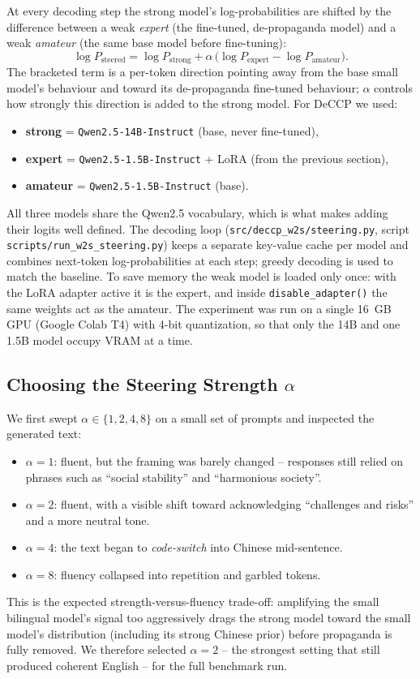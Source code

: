 \documentclass[11pt,a4paper]{article}
\begin{document}
At every decoding step the strong model's log-probabilities are shifted by the difference between a weak \emph{expert} (the fine-tuned, de-propaganda model) and a weak \emph{amateur} (the same base model before fine-tuning):
\[
\log P_{\text{steered}} = \log P_{\text{strong}} + \alpha \,\bigl(\log P_{\text{expert}} - \log P_{\text{amateur}}\bigr).
\]
The bracketed term is a per-token direction pointing away from the base small model's behaviour and toward its de-propaganda fine-tuned behaviour; $\alpha$ controls how strongly this direction is added to the strong model. For DeCCP we used:
\begin{itemize}
    \item \textbf{strong} = \texttt{Qwen2.5-14B-Instruct} (base, never fine-tuned),
    \item \textbf{expert} = \texttt{Qwen2.5-1.5B-Instruct} + LoRA (from the previous section),
    \item \textbf{amateur} = \texttt{Qwen2.5-1.5B-Instruct} (base).
\end{itemize}
All three models share the Qwen2.5 vocabulary, which is what makes adding their logits well defined. The decoding loop (\texttt{src/deccp\_w2s/steering.py}, script \texttt{scripts/run\_w2s\_steering.py}) keeps a separate key-value cache per model and combines next-token log-probabilities at each step; greedy decoding is used to match the baseline. To save memory the weak model is loaded only once: with the LoRA adapter active it is the expert, and inside \texttt{disable\_adapter()} the same weights act as the amateur. The experiment was run on a single 16~GB GPU (Google Colab T4) with 4-bit quantization, so that only the 14B and one 1.5B model occupy VRAM at a time.

\subsection{Choosing the Steering Strength $\alpha$}
We first swept $\alpha \in \{1, 2, 4, 8\}$ on a small set of prompts and inspected the generated text:
\begin{itemize}
    \item $\alpha = 1$: fluent, but the framing was barely changed -- responses still relied on phrases such as ``social stability'' and ``harmonious society''.
    \item $\alpha = 2$: fluent, with a visible shift toward acknowledging ``challenges and risks'' and a more neutral tone.
    \item $\alpha = 4$: the text began to \emph{code-switch} into Chinese mid-sentence.
    \item $\alpha = 8$: fluency collapsed into repetition and garbled tokens.
\end{itemize}
This is the expected strength-versus-fluency trade-off: amplifying the small bilingual model's signal too aggressively drags the strong model toward the small model's distribution (including its strong Chinese prior) before propaganda is fully removed. We therefore selected $\alpha = 2$ -- the strongest setting that still produced coherent English -- for the full benchmark run.
\end{document}

